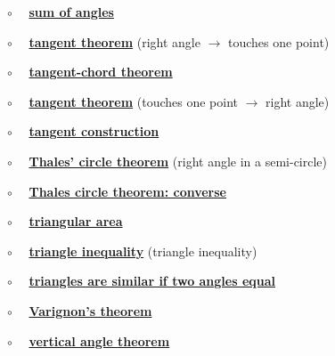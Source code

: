 \documentclass[11pt, oneside]{article}
\begin{document}
$\circ$ \ \  \hyperref[sec:triangle_sum_theorem]{\textbf{sum of angles}}

$\circ$ \ \ \hyperref[sec:tangent_one_point]{\textbf{tangent theorem}} (right angle $\rightarrow$ touches one point)

$\circ$ \ \ \hyperref[sec:tangent_chord_theorem]{\textbf{tangent-chord theorem}}

$\circ$ \ \ \hyperref[sec:tangent_perpendicular]{\textbf{tangent theorem}} (touches one point $\rightarrow$ right angle)

$\circ$ \ \ \hyperref[sec:tangent_construction]{\textbf{tangent construction}}

$\circ$ \ \ \hyperref[sec:Thales_theorem]{\textbf{Thales' circle theorem}} (right angle in a semi-circle)

$\circ$ \ \ \hyperref[sec:Thales_circle_theorem_converse]{\textbf{Thales circle theorem:  converse}}

$\circ$ \ \ \hyperref[sec:triangle_area]{\textbf{triangular area}}

$\circ$ \ \ \hyperref[sec:triangle_inequality]{\textbf{triangle inequality}} (triangle inequality)

$\circ$ \ \ \hyperref[sec:two_angles_similar]{\textbf{triangles are similar if two angles equal}}

$\circ$ \ \ \hyperref[sec:Varignon_theorem]{\textbf{Varignon's theorem}}

$\circ$ \ \ \hyperref[sec:vertical_angle_theorem]{\textbf{vertical angle theorem}}
\end{document}
